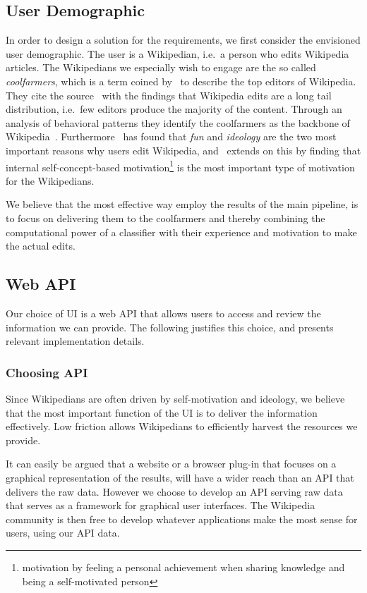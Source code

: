 \subsection{User Demographic}

In order to design a solution for the requirements, we first consider the envisioned user demographic. The user is a Wikipedian, i.e.\ a person who edits Wikipedia articles. The Wikipedians we especially wish to engage are the so called \emph{coolfarmers}, which is a term coined by~\cite{coolfarming} to describe the top editors of Wikipedia. They cite the source~\cite{Priedhorsky:2007:CDR:1316624.1316663} with the findings that Wikipedia edits are a long tail distribution, i.e.\ few editors produce the majority of the content. Through an analysis of behavioral patterns they identify the coolfarmers as the backbone of Wikipedia~\cite{coolfarming}. Furthermore~\cite{wiki_motivation} has found that \emph{fun} and \emph{ideology} are the two most important reasons why users edit Wikipedia, and~\cite{Yang20101377} extends on this by finding that internal self-concept-based motivation\footnote{motivation by feeling a personal achievement when sharing knowledge and being a self-motivated person} is the most important type of motivation for the Wikipedians.

We believe that the most effective way employ the results of the main pipeline, is to focus on delivering them to the coolfarmers and thereby combining the computational power of a classifier with their experience and motivation to make the actual edits.


\subsection{Web API}

Our choice of UI is a web API that allows users to access and review the information we can provide. The following justifies this choice, and presents relevant implementation details.

\subsubsection{Choosing API}
Since Wikipedians are often driven by self-motivation and ideology, we believe that the most important function of the UI is to deliver the information effectively. Low friction allows Wikipedians to efficiently harvest the resources we provide.

It can easily be argued that a website or a browser plug-in that focuses on a graphical representation of the results, will have a wider reach than an API that delivers the raw data. However we choose to develop an API serving raw data that serves as a framework for graphical user interfaces. The Wikipedia community is then free to develop whatever applications make the most sense for users, using our API data.


